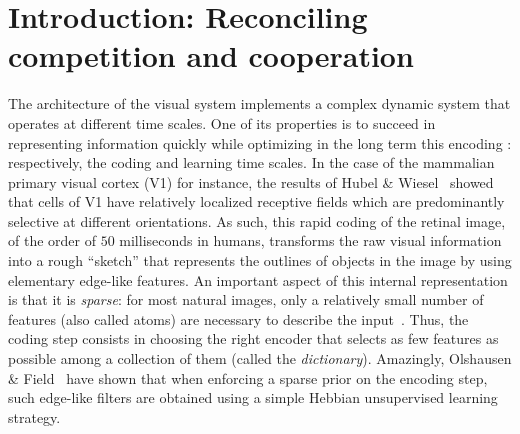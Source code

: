 \documentclass[vision,article,submit,oneauthor,pdftex]{Definitions/mdpi}
\newcommand{\seeFig}[1]{Figure~\ref{fig:#1}}%
\begin{document}
\section{Introduction: Reconciling competition and cooperation}\label{introduction}
The architecture of the visual system implements a complex dynamic system that operates at different time scales. One of its properties is to succeed in representing information quickly while optimizing in the long term this encoding : respectively, the coding and learning time scales. In the case of the mammalian primary visual cortex (V1) for instance, the results of Hubel \& Wiesel~\cite{Hubel68} showed that cells of V1 have relatively localized receptive fields which are predominantly selective at different orientations. As such, this rapid coding of the retinal image, of the order of $50$ milliseconds in humans, transforms the raw visual information into a rough ``sketch'' that represents the outlines of objects in the image by using elementary edge-like features. An important aspect of this internal representation is that it is \emph{sparse}: for most natural images, only a relatively small number of features (also called atoms) are necessary to describe the input~\cite{Perrinet15sparse}. Thus, the coding step consists in choosing the right encoder that selects as few features as possible among a collection of them (called the \emph{dictionary}). Amazingly, Olshausen \& Field~\cite{Olshausen96} have shown that when enforcing a sparse prior on the encoding step, such edge-like filters are obtained using a simple Hebbian unsupervised learning strategy. %
\end{document}
